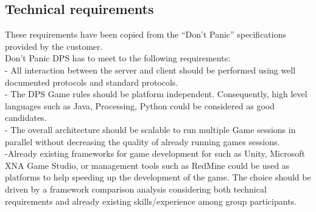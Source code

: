 \subsection{Technical requirements}
These requirements have been copied from the “Don’t Panic” specifications 
provided by the customer.\\

Don’t Panic DPS has to meet to the following requirements:\\
- All interaction between the server and client should be performed using well 
documented protocols and standard protocols.\\
- The DPS Game rules should be platform independent. Consequently, high level 
languages such as Java, Processing, Python could be considered as good 
candidates.\\
- The overall architecture should be scalable to run multiple Game sessions in 
parallel without decreasing the quality of already running games sessions.\\
-Already existing frameworks for game development for such as Unity, Microsoft 
XNA Game Studio, or management tools such as RedMine could be used as platforms 
to help speeding up the development of the game. The choice should be driven by 
a framework comparison analysis considering both technical requirements and 
already existing skills/experience among group participants.






